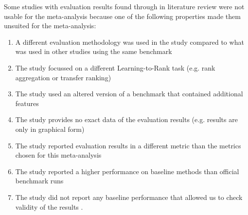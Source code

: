 Some studies with evaluation results found through in literature review were not usable for the meta-analysis because one of the following properties made them unsuited for the meta-analysis:

\begin{enumerate}
\item A different evaluation methodology was used in the study compared to what was used in other studies using the same benchmark \cite{Geng2011, Lin2012}
\item The study focussed on a different Learning-to-Rank task (e.g. rank aggregation or transfer ranking) \cite{De2011, De2010, Derhami2013, De2012, Chen2010, Ah-Pine2008, Wang2009c, De2013, Miao2013, Hoi2008, De2012b, Duh2011b, Argentini2012, Qin2010c, Volkovs2013, Desarkar2011, Pan2013, Lin2011b, Volkovs2012, Dammak2011}
\item The study used an altered version of a benchmark that contained additional features \cite{Bidoki2009, Ding2010}
\item The study provides no exact data of the evaluation results (e.g. results are only in graphical form) \cite{Wang2008, Wang2010, Xu2010, Kuo2009, Li2008, Xia2008, Zhou2011, Wu2011, Zhu2009, Karimzadehgan2011, Swersky2012, Pan2011, Ni2008, Ciaramita2008, Stewart2012, Petterson2009, Agarwal2010, Chang2009, Qin2008c, Adams2011, Sculley2009, Huang2008, Alejo2010, Sun2011, He2010b, Benbouzid2012, Geng2012, Chen2012, Xu2012, Shivaswamy2011}
\item The study reported evaluation results in a different metric than the metrics chosen for this meta-analysis \cite{Yu2009, Thuy2009, Pahikkala2009, Kersting2009, Mohan2011}
\item The study reported a higher performance on baseline methods than official benchmark runs \cite{Dubey2009, Banerjee2009, Peng2010b, Song2014, Bian2010, Bian2010b, Carvalho2008, Acharyya2012, Peng2010b, Tran2012, Asadi2013c}
\item The study did not report any baseline performance that allowed us to check validity of the results \cite{Chakrabarti2008, Wang2012b, Buffoni2011}.
\end{enumerate}

